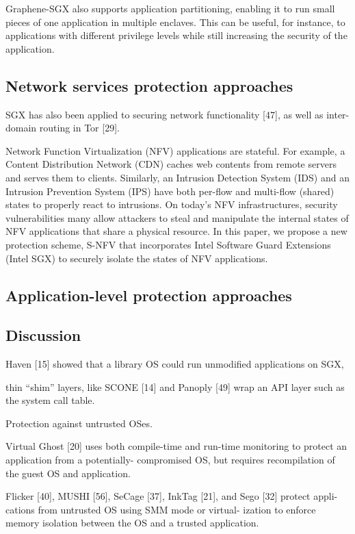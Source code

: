 Graphene-SGX also supports application partitioning, enabling it to run small pieces of one application in multiple enclaves. This can be useful, for instance, to applications with different privilege levels while still increasing the security of the application.

\subsection{Network services protection approaches}

SGX has
also been applied to securing network functionality [47],
as well as inter-domain routing in Tor [29].


Network Function Virtualization (NFV) applications are stateful.
For example, a Content Distribution Network (CDN) caches web
contents from remote servers and serves them to clients. Similarly,
an Intrusion Detection System (IDS) and an Intrusion Prevention
System (IPS) have both per-flow and multi-flow (shared) states to
properly react to intrusions. On today’s NFV infrastructures, security vulnerabilities many allow attackers to steal and manipulate the
internal states of NFV applications that share a physical resource.
In this paper, we propose a new protection scheme, S-NFV that incorporates Intel Software Guard Extensions (Intel SGX) to securely
isolate the states of NFV applications.

\subsection{Application-level protection approaches}

\subsection{Discussion}

Haven [15] showed
that a library OS could run unmodified applications on
SGX,

thin “shim” layers, like SCONE [14] and Panoply [49] wrap 
an API layer such as the system call table.


Protection against untrusted OSes.

Virtual Ghost [20] uses both compile-time and run-time
monitoring to protect an application from a potentially-
compromised OS, but requires recompilation of the
guest OS and application.

Flicker [40], MUSHI [56],
SeCage [37], InkTag [21], and Sego [32] protect appli-
cations from untrusted OS using SMM mode or virtual-
ization to enforce memory isolation between the OS and
a trusted application.

